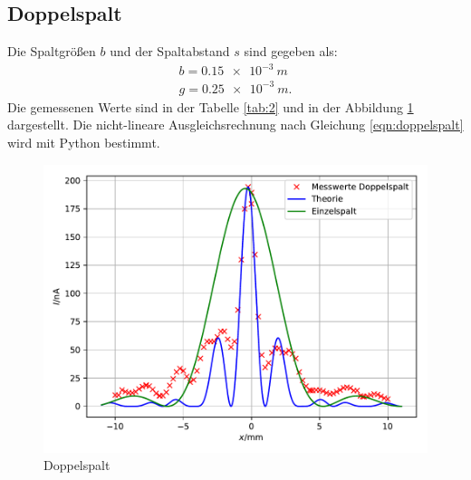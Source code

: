 \subsection{Doppelspalt}
Die Spaltgrößen $b$ und der Spaltabstand $s$ sind gegeben als:
\begin{align*}
  b=\SI{0,15e-3}{m}\\
  g=\SI{0,25e-3}{m}.
\end{align*}
Die gemessenen Werte sind in der Tabelle \ref{tab:2} und in der Abbildung \ref{fig:2} dargestellt.
Die nicht-lineare Ausgleichsrechnung nach Gleichung \ref{eqn:doppelspalt} wird mit Python bestimmt.

\begin{figure}
  \includegraphics{2.pdf}
  \caption{Doppelspalt}
  \label{fig:2}
\end{figure}
\FloatBarrier

